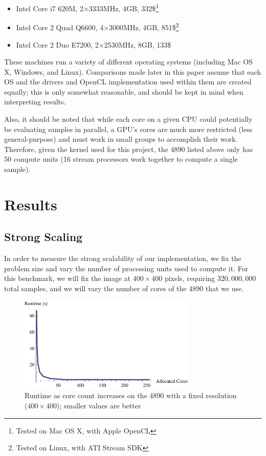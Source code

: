 \documentclass{acmsiggraph}
\begin{document}
\begin{itemize}

\item Intel Core i7 620M, 2$\times$3333MHz, 4GB, 332\$\footnote{Tested on Mac OS X, with Apple OpenCL\label{fn:osx}}

\item Intel Core 2 Quad Q6600, 4$\times$3000MHz, 4GB, 851\$\footnote{Tested on Linux, with ATI Stream SDK\label{fn:linux}}

\item Intel Core 2 Duo E7200, 2$\times$2530MHz, 8GB, 133\$

\end{itemize}

These machines run a variety of different operating systems (including Mac OS X, Windows, and Linux). Comparisons made later in this paper assume that each OS and the drivers and OpenCL implementation used within them are created equally; this is only somewhat reasonable, and should be kept in mind when interpreting results.

Also, it should be noted that while each core on a given CPU could potentially be evaluating samples in parallel, a GPU's cores are much more restricted (less general-purpose) and must work in small groups to accomplish their work. Therefore, given the kernel used for this project, the 4890 listed above only has 50 compute units (16 stream processors work together to compute a single sample).

\section{Results}

\subsection{Strong Scaling}

\label{strongScaling}

In order to measure the strong scalability of our implementation, we fix the problem size and vary the number of processing units used to compute it. For this benchmark, we will fix the image at $400\times400$ pixels, requiring $320,000,000$ total samples, and we will vary the number of cores of the 4890 that we use.

\begin{figure}
    \includegraphics[width=84.5mm]{strongPlotOne.pdf}
    \caption{Runtime as core count increases on the 4890 with a fixed resolution ($400\times400$); smaller values are better}
    \label{fig:strongPlotOne}
\end{figure}
\end{document}
